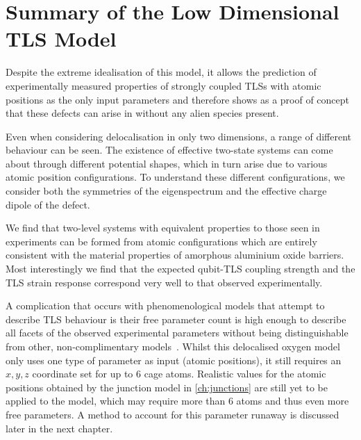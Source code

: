 \section{Summary of the Low Dimensional TLS Model}\label{sec:lowsummary}

Despite the extreme idealisation of this model, it allows the prediction of experimentally measured properties of strongly coupled TLSs with atomic positions as the only input parameters and therefore shows as a proof of concept that these defects can arise in  without any alien species present.

Even when considering delocalisation in only two dimensions, a range of different behaviour can be seen.
The existence of effective two-state systems can come about through different potential shapes, which in turn arise due to various atomic position configurations.
To understand these different configurations, we consider both the symmetries of the eigenspectrum and the effective charge dipole of the defect.

We find that two-level systems with equivalent properties to those seen in experiments can be formed from atomic configurations which are entirely consistent with the material properties of amorphous aluminium oxide barriers.
Most interestingly we find that the expected qubit-TLS coupling strength and the TLS strain response correspond very well to that observed experimentally.

A complication that occurs with phenomenological models that attempt to describe TLS behaviour is their free parameter count is high enough to describe all facets of the observed experimental parameters without being distinguishable from other, non-complimentary models~\cite{Cole2010}.
Whilst this delocalised oxygen model only uses one type of parameter as input (atomic positions), it still requires an $x, y, z$  coordinate set for up to $6$ cage atoms.
Realistic values for the atomic positions obtained by the junction model in \cref{ch:junctions} are still yet to be applied to the model, which may require more than $6$ atoms and thus even more free parameters.
A method to account for this parameter runaway is discussed later in the next chapter.